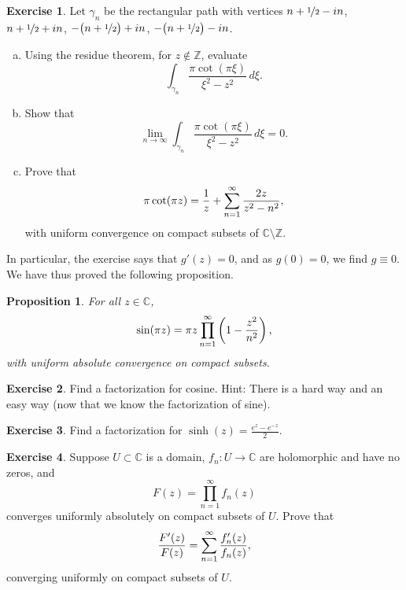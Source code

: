 \documentclass[12pt,openany]{book}
\newcommand{\avoidbreak}{\postdisplaypenalty=100}
\newcommand{\C}{{\mathbb{C}}}
\newcommand{\Z}{{\mathbb{Z}}}
\theoremstyle{plain}
\newtheorem{prop}[thm]{Proposition}
\theoremstyle{remark}
\theoremstyle{definition}
\newenvironment{exbox}{%
    \def\FrameCommand{\vrule width 1pt \relax\hspace{10pt}}%
    \MakeFramed{\advance\hsize-\width\FrameRestore}%
}{%
    \endMakeFramed
}
\newenvironment{exparts}{%
    \leavevmode\begin{enumerate}[a),noitemsep,topsep=0pt,parsep=0pt,partopsep=0pt]
}{%
    \end{enumerate}
}
\theoremstyle{exercise}
\newtheorem{exercise}{Exercise}[section]
\theoremstyle{example}
\begin{document}
\begin{exbox}
\begin{exercise}
Let $\gamma_n$ be the rectangular path with vertices
$n+\nicefrac{1}{2} - in$, 
$n+\nicefrac{1}{2} + in$, 
$-\bigl(n+\nicefrac{1}{2}\bigr) + in$, 
$-\bigl(n+\nicefrac{1}{2}\bigr) - in$.
\begin{exparts}
\item
Using the residue theorem, for $z \notin \Z$, evaluate
\begin{equation*}
\int_{\gamma_n}\frac{\pi \cot (\pi \xi)}{\xi^2-z^2} \, d\xi .
\end{equation*}
\item
Show that
\begin{equation*}
\lim_{n\to \infty}
\int_{\gamma_n}\frac{\pi \cot (\pi \xi)}{\xi^2-z^2} \, d\xi = 0 .
\end{equation*}
\item
Prove that
\begin{equation*}
\pi \cot (\pi z) =
\frac{1}{z}
+
\sum_{n=1}^\infty 
\frac{2z}{z^2-n^2} ,
\avoidbreak
\end{equation*}
with uniform convergence on compact subsets of $\C \setminus \Z$.
\end{exparts}
\end{exercise}
\end{exbox}

In particular, the exercise says that $g'(z)=0$, and as $g(0)=0$, we find $g \equiv 0$.
We have thus proved the following proposition.

\begin{prop}
For all $z \in \C$,
\begin{equation*}
\sin(\pi z) =
\pi z \prod_{n=1}^\infty 
\left(1-\frac{z^2}{n^2}\right) ,
\avoidbreak
\end{equation*}
with uniform absolute convergence on compact subsets.
\end{prop}


\begin{exbox}
\begin{exercise}
Find a factorization for cosine.  Hint: There is a hard way and an
easy way (now that we know the factorization of sine).
\end{exercise}

\begin{exercise}
Find a factorization for $\sinh(z) = \frac{e^z-e^{-z}}{2}$.
\end{exercise}

\begin{exercise}
Suppose $U \subset \C$ is a domain,
$f_n \colon U \to \C$ are holomorphic and have no zeros,
and
\begin{equation*}
F(z) = \prod_{n=1}^\infty f_n(z)
\end{equation*}
converges
uniformly absolutely
on compact subsets of $U$.  Prove that
\begin{equation*}
\frac{F'(z)}{F(z)} = \sum_{n=1}^\infty \frac{f_n'(z)}{f_n(z)} ,
\avoidbreak
\end{equation*}
converging uniformly on compact subsets of $U$.
\end{exercise}
\end{exbox}
\end{document}
